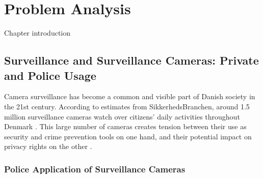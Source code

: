 \chapter{Problem Analysis}
\label{cha:problemanalysis}
Chapter introduction

\section{Surveillance and Surveillance Cameras: Private and Police Usage}

Camera surveillance has become a common and visible part of Danish society in the 21st century. According to estimates from SikkerhedsBranchen, around 1.5 million surveillance cameras watch over citizens' daily activities throughout Denmark \cite{overvagningsekspert2025}. This large number of cameras creates tension between their use as security and crime prevention tools on one hand, and their potential impact on privacy rights on the other \cite{videnskab2024}.

\subsection{Police Application of Surveillance Cameras}
\label{subsec:Police_Application}


